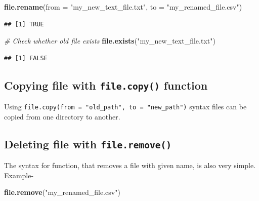 \documentclass[
]{book}
\newenvironment{Shaded}{\begin{snugshade}}{\end{snugshade}}
\newcommand{\AttributeTok}[1]{\textcolor[rgb]{0.13,0.29,0.53}{#1}}
\newcommand{\CommentTok}[1]{\textcolor[rgb]{0.56,0.35,0.01}{\textit{#1}}}
\newcommand{\FunctionTok}[1]{\textcolor[rgb]{0.13,0.29,0.53}{\textbf{#1}}}
\newcommand{\NormalTok}[1]{#1}
\newcommand{\StringTok}[1]{\textcolor[rgb]{0.31,0.60,0.02}{#1}}
\begin{document}
\begin{Shaded}
\begin{Highlighting}[]
\FunctionTok{file.rename}\NormalTok{(}\AttributeTok{from =} \StringTok{"my\_new\_text\_file.txt"}\NormalTok{, }\AttributeTok{to =} \StringTok{"my\_renamed\_file.csv"}\NormalTok{)}
\end{Highlighting}
\end{Shaded}

\begin{verbatim}
## [1] TRUE
\end{verbatim}

\begin{Shaded}
\begin{Highlighting}[]
\CommentTok{\# Check whether old file exists}
\FunctionTok{file.exists}\NormalTok{(}\StringTok{"my\_new\_text\_file.txt"}\NormalTok{)}
\end{Highlighting}
\end{Shaded}

\begin{verbatim}
## [1] FALSE
\end{verbatim}

\hypertarget{copying-file-with-file.copy-function}{%
\subsection{\texorpdfstring{Copying file with \texttt{file.copy()} function}{Copying file with file.copy() function}}\label{copying-file-with-file.copy-function}}

Using \texttt{file.copy(from\ =\ "old\_path",\ to\ =\ "new\_path")} syntax  files can be copied from one directory to another.

\hypertarget{deleting-file-with-file.remove}{%
\subsection{\texorpdfstring{Deleting file with \texttt{file.remove()}}{Deleting file with file.remove()}}\label{deleting-file-with-file.remove}}

The syntax for function, that removes a file with given name, is also very simple. Example-

\begin{Shaded}
\begin{Highlighting}[]
\FunctionTok{file.remove}\NormalTok{(}\StringTok{"my\_renamed\_file.csv"}\NormalTok{)}
\end{Highlighting}
\end{Shaded}
\end{document}
